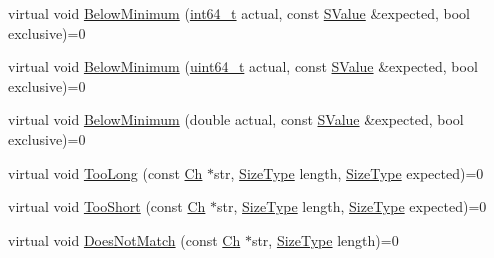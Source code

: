 \begin{DoxyCompactItemize}
\item 
virtual void \mbox{\hyperlink{classrapidjson_1_1internal_1_1_i_validation_error_handler_a8f2ab1e22a22bcf693d40c3c8ad39c75}{Below\+Minimum}} (\mbox{\hyperlink{stdint_8h_a414156feea104f8f75b4ed9e3121b2f6}{int64\+\_\+t}} actual, const \mbox{\hyperlink{classrapidjson_1_1internal_1_1_i_validation_error_handler_a8a2aaf7eb28a3ce7ed81689141f3af1f}{S\+Value}} \&expected, bool exclusive)=0
\item 
virtual void \mbox{\hyperlink{classrapidjson_1_1internal_1_1_i_validation_error_handler_a903f5f9cff1fdd68139903ff394a1205}{Below\+Minimum}} (\mbox{\hyperlink{stdint_8h_aec6fcb673ff035718c238c8c9d544c47}{uint64\+\_\+t}} actual, const \mbox{\hyperlink{classrapidjson_1_1internal_1_1_i_validation_error_handler_a8a2aaf7eb28a3ce7ed81689141f3af1f}{S\+Value}} \&expected, bool exclusive)=0
\item 
virtual void \mbox{\hyperlink{classrapidjson_1_1internal_1_1_i_validation_error_handler_a135b3fb482df1b3241f679ffa53b2f57}{Below\+Minimum}} (double actual, const \mbox{\hyperlink{classrapidjson_1_1internal_1_1_i_validation_error_handler_a8a2aaf7eb28a3ce7ed81689141f3af1f}{S\+Value}} \&expected, bool exclusive)=0
\item 
virtual void \mbox{\hyperlink{classrapidjson_1_1internal_1_1_i_validation_error_handler_a9e26e52da7914dd0a9e7a4e06db8943c}{Too\+Long}} (const \mbox{\hyperlink{classrapidjson_1_1internal_1_1_i_validation_error_handler_a02c672a313401138fd08504062f3d1d0}{Ch}} $\ast$str, \mbox{\hyperlink{namespacerapidjson_a44eb33eaa523e36d466b1ced64b85c84}{Size\+Type}} length, \mbox{\hyperlink{namespacerapidjson_a44eb33eaa523e36d466b1ced64b85c84}{Size\+Type}} expected)=0
\item 
virtual void \mbox{\hyperlink{classrapidjson_1_1internal_1_1_i_validation_error_handler_af13eb2448c9606f58af8cecc009bea85}{Too\+Short}} (const \mbox{\hyperlink{classrapidjson_1_1internal_1_1_i_validation_error_handler_a02c672a313401138fd08504062f3d1d0}{Ch}} $\ast$str, \mbox{\hyperlink{namespacerapidjson_a44eb33eaa523e36d466b1ced64b85c84}{Size\+Type}} length, \mbox{\hyperlink{namespacerapidjson_a44eb33eaa523e36d466b1ced64b85c84}{Size\+Type}} expected)=0
\item 
virtual void \mbox{\hyperlink{classrapidjson_1_1internal_1_1_i_validation_error_handler_a67070bdbe6ed6196e6e2a9755fa76c9c}{Does\+Not\+Match}} (const \mbox{\hyperlink{classrapidjson_1_1internal_1_1_i_validation_error_handler_a02c672a313401138fd08504062f3d1d0}{Ch}} $\ast$str, \mbox{\hyperlink{namespacerapidjson_a44eb33eaa523e36d466b1ced64b85c84}{Size\+Type}} length)=0

\end{DoxyCompactItemize}
